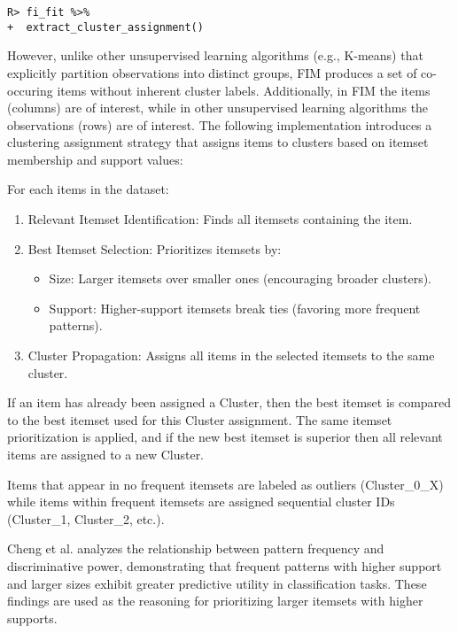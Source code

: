 \documentclass[
  article]{jss}
\begin{document}
\begin{verbatim}
R> fi_fit %>% 
+  extract_cluster_assignment()
\end{verbatim}

However, unlike other unsupervised learning algorithms (e.g., K-means)
that explicitly partition observations into distinct groups, FIM
produces a set of co-occuring items without inherent cluster labels.
Additionally, in FIM the items (columns) are of interest, while in other
unsupervised learning algorithms the observations (rows) are of
interest. The following implementation introduces a clustering
assignment strategy that assigns items to clusters based on itemset
membership and support values:

For each items in the dataset:

\begin{enumerate}
\def\labelenumi{\arabic{enumi}.}
\item
  Relevant Itemset Identification: Finds all itemsets containing the
  item.
\item
  Best Itemset Selection: Prioritizes itemsets by:

  \begin{itemize}
  \item
    Size: Larger itemsets over smaller ones (encouraging broader
    clusters).
  \item
    Support: Higher-support itemsets break ties (favoring more frequent
    patterns).
  \end{itemize}
\item
  Cluster Propagation: Assigns all items in the selected itemsets to the
  same cluster.
\end{enumerate}

If an item has already been assigned a Cluster, then the best itemset is
compared to the best itemset used for this Cluster assignment. The same
itemset prioritization is applied, and if the new best itemset is
superior then all relevant items are assigned to a new Cluster.

Items that appear in no frequent itemsets are labeled as outliers
(Cluster\_0\_X) while items within frequent itemsets are assigned
sequential cluster IDs (Cluster\_1, Cluster\_2, etc.).

Cheng et al. \citeyearpar{cheng_discriminative_2007} analyzes the
relationship between pattern frequency and discriminative power,
demonstrating that frequent patterns with higher support and larger
sizes exhibit greater predictive utility in classification tasks. These
findings are used as the reasoning for prioritizing larger itemsets with
higher supports.
\end{document}
